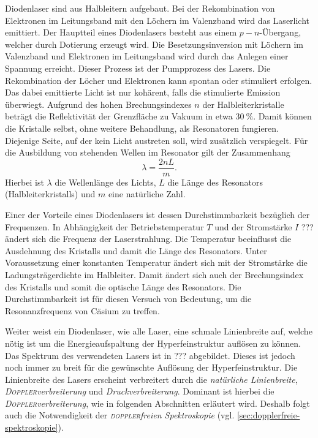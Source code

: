 \documentclass[../bericht.tex]{subfiles}
\begin{document}
      Diodenlaser sind aus Halbleitern aufgebaut. Bei der Rekombination von Elektronen im Leitungsband mit den Löchern im Valenzband wird das Laserlicht emittiert. Der Hauptteil eines Diodenlasers besteht aus einem $p-n$-Übergang, welcher durch Dotierung erzeugt wird. Die Besetzungsinversion mit Löchern im Valenzband und Elektronen im Leitungsband wird durch das Anlegen einer Spannung erreicht. Dieser Prozess ist der Pumpprozess des Lasers. Die Rekombination der Löcher und Elektronen kann spontan oder stimuliert erfolgen. Das dabei emittierte Licht ist nur kohärent, falls die stimulierte Emission überwiegt. Aufgrund des hohen Brechungsindexes $n$ der Halbleiterkristalle beträgt die Reflektivität der Grenzfläche zu Vakuum in etwa $\SI{30}{\percent}$. Damit können die Kristalle selbst, ohne weitere Behandlung, als Resonatoren fungieren. Diejenige Seite, auf der kein Licht austreten soll, wird zusätzlich verspiegelt. Für die Ausbildung von stehenden Wellen im Resonator gilt der Zusammenhang
      \begin{equation*}
        \lambda = \frac{2nL}{m}.
      \end{equation*}
      Hierbei ist $\lambda$ die Wellenlänge des Lichts, $L$ die Länge des Resonators (Halbleiterkristalls) und $m$ eine natürliche Zahl.

      Einer der Vorteile eines Diodenlasers ist dessen Durchstimmbarkeit bezüglich der Frequenzen. In Abhängigkeit der Betriebstemperatur $T$ und der Stromstärke $I$ ??? ändert sich die Frequenz der Laserstrahlung. Die Temperatur beeinflusst die Ausdehnung des Kristalls und damit die Länge des Resonators. Unter Voraussetzung einer konstanten Temperatur ändert sich mit der Stromstärke die Ladungsträgerdichte im Halbleiter. Damit ändert sich auch der Brechungsindex des Kristalls und somit die optische Länge des Resonators.
      Die Durchstimmbarkeit ist für diesen Versuch von Bedeutung, um die Resonanzfrequenz von Cäsium zu treffen.
      \medskip

      Weiter weist ein Diodenlaser, wie alle Laser, eine schmale Linienbreite auf, welche nötig ist um die Energieaufspaltung der Hyperfeinstruktur auflösen zu können. Das Spektrum des verwendeten Lasers ist in ??? abgebildet. Dieses ist jedoch noch immer zu breit für die gewünschte Auflösung der Hyperfeinstruktur. Die Linienbreite des Lasers erscheint verbreitert durch die \textit{natürliche Linienbreite}, \textit{\textsc{Doppler}verbreiterung} und \textit{Druckverbreiterung}. Dominant ist hierbei die \textit{\textsc{Doppler}verbreiterung}, wie in folgenden Abschnitten erläutert wird. Deshalb folgt auch die Notwendigkeit der \textit{\textsc{doppler}freien Spektroskopie} (vgl. \ref{sec:dopplerfreie-spektroskopie}).
      \medskip
\end{document}
